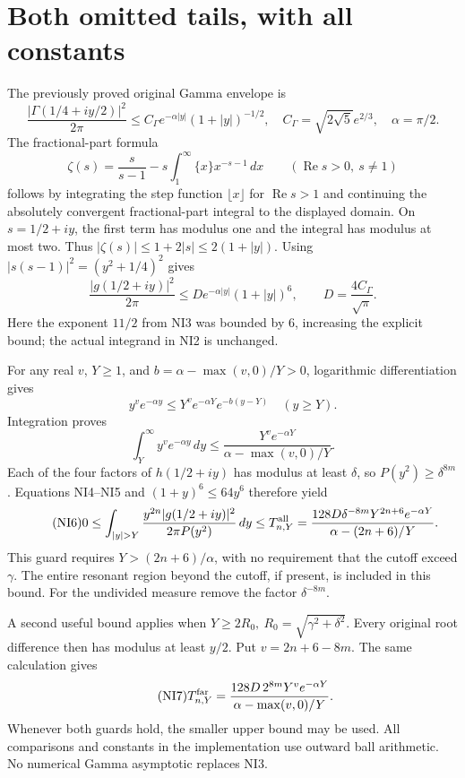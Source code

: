 \documentclass[11pt]{article}
\begin{document}
\section{Both omitted tails, with all constants}
The previously proved original Gamma envelope \cite{NP} is
\begin{equation}\tag{NI3}
 \frac{|\Gamma(1/4+iy/2)|^2}{2\pi}
 \le C_\Gamma e^{-\alpha |y|}(1+|y|)^{-1/2},\quad
 C_\Gamma=\sqrt{2\sqrt5}e^{2/3},\quad \alpha=\pi/2.
\end{equation}
The fractional-part formula
\[
 \zeta(s)=\frac{s}{s-1}-s\int_1^\infty\{x\}x^{-s-1}\,dx
 \qquad(\operatorname{Re}s>0,\ s\ne1)
\]
follows by integrating the step function \(\lfloor x\rfloor\)
for \(\operatorname{Re}s>1\) and continuing the absolutely
convergent fractional-part integral to the displayed domain.
On \(s=1/2+iy\), the first term has modulus one and the integral
has modulus at most two. Thus
\(|\zeta(s)|\le1+2|s|\le2(1+|y|)\).
Using \(|s(s-1)|^2=(y^2+1/4)^2\) gives
\begin{equation}\tag{NI4}
 \frac{|g(1/2+iy)|^2}{2\pi}
 \le D e^{-\alpha |y|}(1+|y|)^6,\qquad
 D=\frac{4C_\Gamma}{\sqrt\pi}.
\end{equation}
Here the exponent \(11/2\) from NI3 was bounded by \(6\), increasing
the explicit bound; the actual integrand in NI2 is unchanged.

For any real \(v\), \(Y\ge1\), and
\(b=\alpha-\max(v,0)/Y>0\), logarithmic differentiation gives
\[
 y^v e^{-\alpha y}
 \le Y^v e^{-\alpha Y}e^{-b(y-Y)}\quad(y\ge Y).
\]
Integration proves
\begin{equation}\tag{NI5}
 \int_Y^\infty y^v e^{-\alpha y}\,dy
 \le \frac{Y^v e^{-\alpha Y}}{\alpha-\max(v,0)/Y}.
\end{equation}
Each of the four factors of \(h(1/2+iy)\) has modulus at least
\(\delta\), so \(P(y^2)\ge\delta^{8m}\).
Equations NI4--NI5 and \((1+y)^6\le64y^6\) therefore yield
\begin{equation}\tag{NI6}
 0\le \int_{|y|>Y}\frac{y^{2n}|g(1/2+iy)|^2}{2\pi P(y^2)}\,dy
 \le T_{n,Y}^{\rm all}
 =\frac{128D\delta^{-8m}Y^{2n+6}e^{-\alpha Y}}
 {\alpha-(2n+6)/Y}.
\end{equation}
This guard requires \(Y>(2n+6)/\alpha\), with no requirement
that the cutoff exceed \(\gamma\). The entire resonant region
beyond the cutoff, if present, is included in this bound.
For the undivided measure remove the factor \(\delta^{-8m}\).

A second useful bound applies when
\(Y\ge2R_0,\ R_0=\sqrt{\gamma^2+\delta^2}\).
Every original root difference then has modulus at least \(y/2\).
Put \(v=2n+6-8m\). The same calculation gives
\begin{equation}\tag{NI7}
 T_{n,Y}^{\rm far}=
 \frac{128D\,2^{8m}Y^{v}e^{-\alpha Y}}
 {\alpha-\max(v,0)/Y}.
\end{equation}
Whenever both guards hold, the smaller upper bound may be used.
All comparisons and constants in the implementation use outward
ball arithmetic. No numerical Gamma asymptotic replaces NI3.
\end{document}
